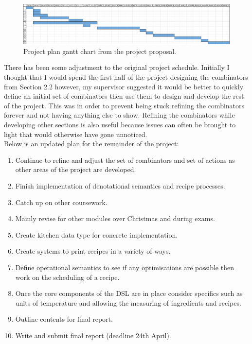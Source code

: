 \documentclass[11pt]{article}
\begin{document}
    \begin{figure}[ht]
        \centering
            \includegraphics[width=\textwidth,keepaspectratio]{gantt_chart.jpg}
        \caption{Project plan gantt chart from the project proposal.}
    \end{figure}

    There has been some adjustment to the original project schedule. Initially I thought that I would spend
    the first half of the project designing the combinators from Section 2.2 however, my supervisor suggested
    it would be better to quickly define an initial set of combinators then use them to design and develop the
    rest of the project. This was in order to prevent being stuck refining the combinators forever and not having
    anything else to show. Refining the combinators while developing other sections is also useful because issues
    can often be brought to light that would otherwise have gone unnoticed. \\

    Below is an updated plan for the remainder of the project:

    \begin{enumerate}

        \item Continue to refine and adjust the set of combinators and set of
        actions as other areas of the project are developed.

        \item Finish implementation of denotational semantics and recipe processes.

        \item Catch up on other coursework.

        \item Mainly revise for other modules over Christmas and during
        exams.

        \item Create kitchen data type for concrete implementation.

        \item Create systems to print recipes in a variety of ways.

        \item Define operational semantics to see if any optimisations are possible
        then work on the scheduling of a recipe.

        \item Once the core components of the DSL are in place
        consider specifics such as units of temperature and allowing the
        measuring of ingredients and recipes.

        \item Outline contents for final report.

        \item Write and submit final report (deadline 24th April).

    \end{enumerate}
\end{document}
